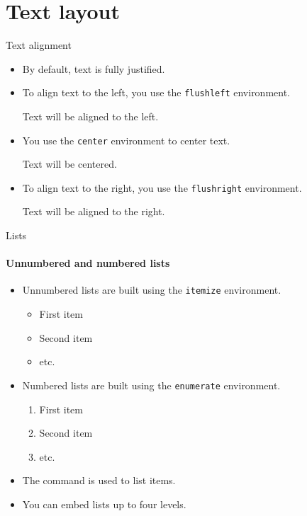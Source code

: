 \section{Text layout}

\begin{frame}[fragile]{Text alignment}
	\begin{itemize}
		\item By default, text is fully justified.
		\item To align text to the left, you use the \texttt{flushleft} environment.
\begin{codesource}
\begin{flushleft}
	Text will be aligned to the left.
\end{flushleft}
\end{codesource}
		\item You use the \texttt{center} environment to center text.
\begin{codesource}
	\begin{center}
		Text will be centered.
	\end{center}
\end{codesource}
		\item To align text to the right, you use the \texttt{flushright} environment.
\begin{codesource}
	\begin{flushright}
		Text will be aligned to the right.
	\end{flushright}
\end{codesource}
	\end{itemize}
\end{frame}

\begin{frame}[fragile]{Lists}
	\framesubtitle{Unnumbered and numbered lists}
	\begin{itemize}
		\item Unnumbered lists are built using the \texttt{itemize} environment.
\begin{codesource}
	\begin{itemize}
		\item First item
		\item Second item
		\item etc.
	\end{itemize}
\end{codesource}
		\item Numbered lists are built using the \texttt{enumerate} environment.
\begin{codesource}
	\begin{enumerate}
		\item First item
		\item Second item
		\item etc.
	\end{enumerate}
\end{codesource}
		\item The  command is used to list items.
		\item You can embed lists up to four levels.
	\end{itemize}
\end{frame}

